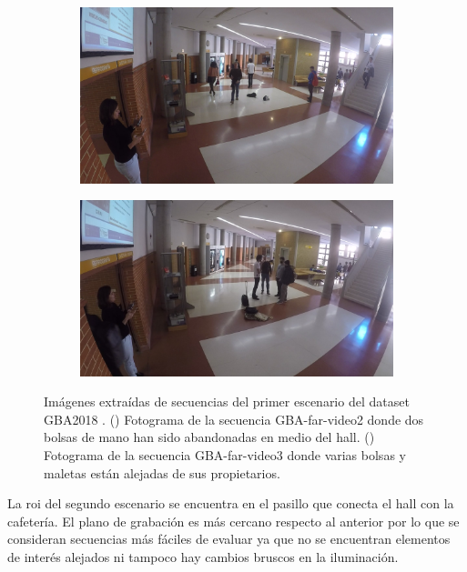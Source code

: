 \begin{figure}[ht!]
  \centering
  \begin{subfigure}[b]{0.4\textwidth}
    \includegraphics[width=\textwidth]{img/chapters/resultados/datasets/GBA_1.jpg}
    \caption{}
    \label{fig:GBA_1}
  \end{subfigure}
  \qquad\qquad
  \begin{subfigure}[b]{0.4\textwidth}
    \includegraphics[width=\textwidth]{img/chapters/resultados/datasets/GBA_2.jpg}
    \caption{}
    \label{fig:GBA_2}
  \end{subfigure}
  \caption{Imágenes extraídas de secuencias del primer escenario del dataset GBA2018 \cite{gba-dataset}.
    (\protect{}) Fotograma de la secuencia GBA-far-video2 donde dos bolsas de mano han sido abandonadas en medio del hall.
    (\protect{}) Fotograma de la secuencia GBA-far-video3 donde varias bolsas y maletas están alejadas de sus propietarios.}
  \label{fig:GBA1}
\end{figure}

La \gls{roi} del segundo escenario se encuentra en el pasillo que conecta el hall con la cafetería. El plano de grabación es más cercano respecto al anterior por lo que se consideran secuencias más fáciles de evaluar ya que no se encuentran elementos de interés alejados ni tampoco hay cambios bruscos en la iluminación.


